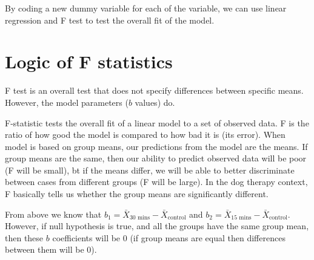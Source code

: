 By coding a new dummy variable for each of the variable, we can use linear regression and F test to test the overall fit of the model.

\section{Logic of F statistics}

F test is an overall test that does not specify differences between specific means. However, the model parameters ($b$ values) do. 

F-statistic tests the overall fit of a linear model to a set of observed data. F is the ratio of how good the model is compared to how bad it is (its error). When model is based on group means, our predictions from the model are the means. If group means are the same, then our ability to predict observed data will be poor (F will be small), bt if the means differ, we will be able to better discriminate between cases from different groups (F will be large). In the dog therapy context, F basically tells us whether the group means are significantly different.

From above we know that $b_1 = \bar{X}_{\text{30 mins}} - \bar{X}_{\text{control}} $  and $b_2 = \bar{X}_{\text{15 mins}} - \bar{X}_{\text{control}} $. However, if null hypothesis is true, and all the groups have the same group mean, then these $b$ coefficients will be 0 (if group means are equal then differences between them will be 0).\\

